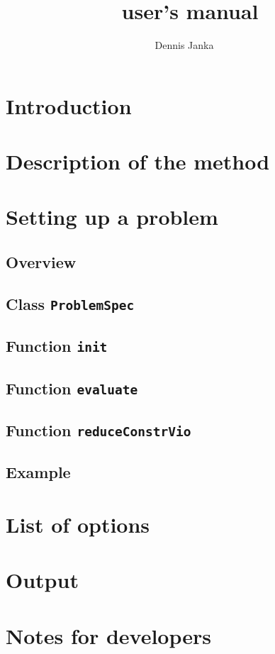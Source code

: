 \documentclass[	11pt,
				a4paper,
				abstract=true,
				twoside=true,
				bibliography=totoc, 
				headinclude=true,
				chapterprefix=true,
				footinclude=false]{scrartcl}
\title{\blockSQP\ user's manual}
\author{Dennis Janka}
\newcommand{\problem}{\texttt{ProblemSpec}}
\newcommand{\init}{\texttt{init}}
\newcommand{\evaluate}{\texttt{evaluate}}
\newcommand{\reduce}{\texttt{reduceConstrVio}}
\begin{document}
\maketitle
\tableofcontents
\clearpage
\section{Introduction}
\section{Description of the method}
\section{Setting up a problem}
\subsection{Overview}
\subsection{Class \problem}
\subsection{Function \init}
\subsection{Function \evaluate}
\subsection{Function \reduce}
\subsection{Example}
\section{List of options}
\section{Output}
\section{Notes for developers}
\end{document}
